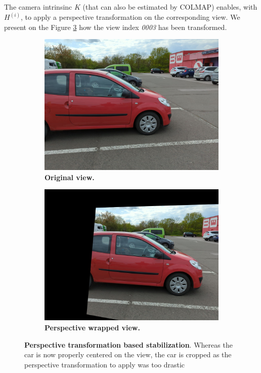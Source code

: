 The camera intrinsinc $K$ (that can also be estimated by COLMAP) enables, with $H^{(i)}$, to apply a perspective transformation on the corresponding view. We present on the Figure \ref{fig:gs-homography-view3} how the view index \textit{0003} has been transformed. 

\begin{figure}[htb!]
  \centering
  \begin{subfigure}[b]{0.45\linewidth}
    \includegraphics[width=\linewidth]{images/gaussiansplatting/gt/img-3.jpg}
    \caption{\textbf{Original view.}}
    \label{fig:view3}
  \end{subfigure}
  \quad %
  \begin{subfigure}[b]{0.45\linewidth}
    \includegraphics[width=\linewidth]{images/gaussiansplatting/stabhomo/img-3.jpg}
    \caption{\textbf{Perspective wrapped view.}}
    \label{fig:gs-view3-homo}
  \end{subfigure}
  \caption{\textbf{Perspective transformation based stabilization}. Whereas the car is now properly centered on the view, the car is cropped as the perspective transformation to apply was too drastic}
  \label{fig:gs-homography-view3}
\end{figure}

